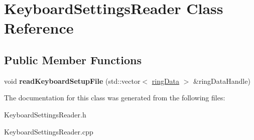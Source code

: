 \hypertarget{class_keyboard_settings_reader}{\section{Keyboard\+Settings\+Reader Class Reference}
\label{class_keyboard_settings_reader}
}
\subsection*{Public Member Functions}
\begin{DoxyCompactItemize}
\item 
\hypertarget{class_keyboard_settings_reader_a38bbabeccef0fe7dea9ac2e3feb3e6d2}{void {\bfseries read\+Keyboard\+Setup\+File} (std\+::vector$<$ \hyperlink{classring_data}{ring\+Data} $>$ \&ring\+Data\+Handle)}\label{class_keyboard_settings_reader_a38bbabeccef0fe7dea9ac2e3feb3e6d2}

\end{DoxyCompactItemize}


The documentation for this class was generated from the following files\+:\begin{DoxyCompactItemize}
\item 
Keyboard\+Settings\+Reader.\+h\item 
Keyboard\+Settings\+Reader.\+cpp\end{DoxyCompactItemize}
